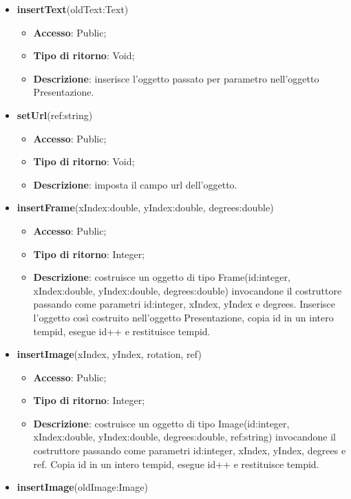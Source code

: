 {{\begin{itemize}
\begin{itemize}
			\end{itemize}
			\item \textbf{insertText}(oldText:Text)
			\begin{itemize}
				\item \textbf{Accesso}: Public;
				\item \textbf{Tipo di ritorno}: Void;
				\item \textbf{Descrizione}: inserisce l’oggetto passato per parametro nell’oggetto Presentazione.
			\end{itemize}
			\item \textbf{setUrl}(ref:string)
			\begin{itemize}
				\item \textbf{Accesso}: Public;
				\item \textbf{Tipo di ritorno}: Void;
				\item \textbf{Descrizione}: imposta il campo url dell’oggetto.
			\end{itemize}
			\item \textbf{insertFrame}(xIndex:double, yIndex:double, degrees:double)
			\begin{itemize}
				\item \textbf{Accesso}: Public;
				\item \textbf{Tipo di ritorno}: Integer;
				\item \textbf{Descrizione}: costruisce un oggetto di tipo Frame(id:integer, xIndex:double, yIndex:double, degrees:double) invocandone il costruttore passando come parametri id:integer, xIndex, yIndex e degrees. Inserisce l’oggetto così costruito nell’oggetto Presentazione, copia id in un intero tempid, esegue id++ e restituisce tempid.
			\end{itemize}
			\item \textbf{insertImage}(xIndex, yIndex, rotation, ref)
			\begin{itemize}
				\item \textbf{Accesso}: Public;
				\item \textbf{Tipo di ritorno}: Integer;
				\item \textbf{Descrizione}: costruisce un oggetto di tipo Image(id:integer, xIndex:double, yIndex:double, degrees:double, ref:string) invocandone il costruttore passando come parametri id:integer, xIndex, yIndex, degrees e ref. Copia id in un intero tempid, esegue id++ e restituisce tempid.
			\end{itemize}
			\item \textbf{insertImage}(oldImage:Image)
			\begin{itemize}

\end{itemize}
\end{itemize}}}

